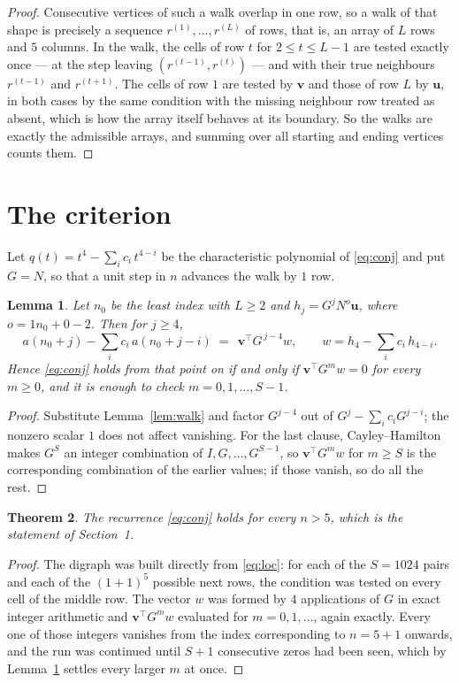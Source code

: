 \documentclass[11pt,a4paper]{article}
\theoremstyle{plain}
\newtheorem{theorem}{Theorem}
\newtheorem{lemma}[theorem]{Lemma}
\theoremstyle{definition}
\begin{document}
\begin{proof}
Consecutive vertices of such a walk overlap in one row, so a walk of that shape is
precisely a sequence $r^{(1)},\dots,r^{(L)}$ of rows, that is, an array of $L$ rows
and $5$ columns. In the walk, the cells of row $t$ for $2\le t\le L-1$ are tested
exactly once --- at the step leaving $(r^{(t-1)},r^{(t)})$ --- and with their true
neighbours $r^{(t-1)}$ and $r^{(t+1)}$. The cells of row $1$ are tested by
$\mathbf{v}$ and those of row $L$ by $\mathbf{u}$, in both cases by the same condition
with the missing neighbour row treated as absent, which is how the array itself behaves at
its boundary. So the walks are exactly the admissible arrays, and summing over all starting
and ending vertices counts them.
\end{proof}

\section{The criterion}

Let $q(t)=t^{4}-\sum_i c_i\,t^{4-i}$ be the characteristic polynomial of
\eqref{eq:conj} and put $G=N$, so that a unit step in $n$ advances the walk by
$1$ row.

\begin{lemma}\label{lem:crit}
Let $n_0$ be the least index with $L\ge2$ and $h_j=G^{j}N^{o}\mathbf{u}$, where
$o=1n_0+0-2$. Then for $j\ge4$,
\[
a(n_0+j)-\sum_i c_i\,a(n_0+j-i)\;=\;\,\mathbf{v}^{\!\top}G^{\,j-4}w,
\qquad w=h_{4}-\sum_i c_i\,h_{4-i} .
\]
Hence \eqref{eq:conj} holds from that point on if and only if
$\mathbf{v}^{\!\top}G^{m}w=0$ for every $m\ge0$, and it is enough to check
$m=0,1,\dots,S-1$.
\end{lemma}

\begin{proof}
Substitute Lemma~\ref{lem:walk} and factor $G^{j-4}$ out of
$G^{j}-\sum_ic_iG^{j-i}$; the nonzero scalar $1$ does not affect
vanishing. For the last clause, Cayley--Hamilton makes $G^{S}$ an integer combination of
$I,G,\dots,G^{S-1}$, so $\mathbf{v}^{\!\top}G^{m}w$ for $m\ge S$ is the corresponding
combination of the earlier values; if those vanish, so do all the rest.
\end{proof}

\begin{theorem}
The recurrence \eqref{eq:conj} holds for every $n>5$, which is the statement of
Section~1.
\end{theorem}

\begin{proof}
The digraph was built directly from \eqref{eq:loc}: for each of the $S=1024$ pairs and each
of the $(1+1)^{5}$ possible next rows, the condition was tested on every cell of
the middle row. The vector $w$ was formed by $4$ applications of $G$ in exact integer
arithmetic and $\mathbf{v}^{\!\top}G^{m}w$ evaluated for $m=0,1,\dots$, again exactly.
Every one of those integers vanishes from the index corresponding to $n=5+1$ onwards,
and the run was continued until $S+1$ consecutive zeros had been seen, which by
Lemma~\ref{lem:crit} settles every larger $m$ at once.
\end{proof}
\end{document}
